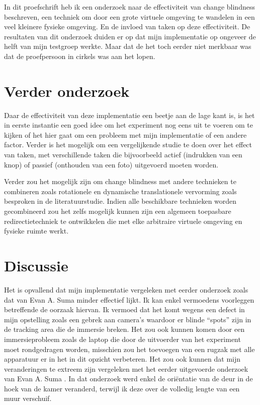 In dit proefschrift heb ik een onderzoek naar de effectiviteit van change
blindness beschreven, een techniek om door een grote virtuele omgeving te
wandelen in een veel kleinere fysieke omgeving. En de invloed van taken op
deze effectiviteit. De resultaten van dit onderzoek duiden er op dat mijn 
implementatie op ongeveer de helft van mijn testgroep werkte. Maar dat de het 
toch eerder niet merkbaar was dat de proefpersoon in cirkels was aan het lopen.


\section{Verder onderzoek}
Daar de effectiviteit van deze implementatie een beetje aan de lage kant is, is 
het in eerste instantie een goed idee om het experiment nog eens uit te voeren om
te kijken of het hier gaat om een probleem met mijn implementatie of een andere
factor. Verder is het mogelijk om een vergelijkende studie te doen over het 
effect van taken, met verschillende taken die bijvoorbeeld actief (indrukken van 
een knop) of passief (onthouden van een foto) uitgevoerd moeten worden.

Verder zou het mogelijk zijn om change blindness met andere technieken te
combineren zoals rotationele en dynamische translationele vervorming zoals
besproken in de literatuurstudie. Indien alle beschikbare technieken worden 
gecombineerd zou het zelfs mogelijk kunnen zijn een algemeen toepasbare 
redirectietechniek te ontwikkelen die met elke arbitraire virtuele omgeving en 
fysieke ruimte werkt.


\section{Discussie}
Het is opvallend dat mijn implementatie vergeleken met eerder onderzoek zoals dat 
van Evan A. Suma \cite{suma11} minder effectief lijkt. Ik kan enkel vermoedens
voorleggen betreffende de oorzaak hiervan. Ik vermoed dat het komt wegens
een defect in mijn opstelling zoals een gebrek aan camera's waardoor er blinde 
``spots'' zijn in de tracking area die de immersie breken. Het zou ook kunnen 
komen door een immersieprobleem zoals de laptop die door de uitvoerder van het 
experiment moet rondgedragen worden, misschien zou het toevoegen van een rugzak
met alle apparatuur er in het in dit opzicht verbeteren. Het zou ook kunnen dat 
mijn veranderingen te extreem zijn vergeleken met het eerder uitgevoerde 
onderzoek van Evan A. Suma \cite{suma11}. In dat onderzoek werd enkel de 
ori\"entatie van de deur in de hoek van de kamer veranderd, terwijl ik deze over 
de volledig lengte van een muur verschuif.